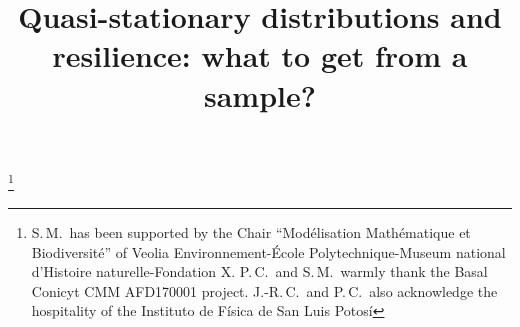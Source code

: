 \documentclass[JEP,XML,SOM,Unicode]{cedram}
\numberwithin{equation}{section}
\theoremstyle{plain}
\theoremstyle{definition}
\begin{document}
\frontmatter
\title{Quasi-stationary distributions and resilience: what to get from a sample?}

\author[\initial{J.-R.} \lastname{Chazottes}]{ }
\address{CPHT, CNRS, École polytechnique, Institut polytechnique de Paris\\
F-91128 Palaiseau, France}

\author[\initial{P.} \lastname{Collet}]{ }
\address{CPHT, CNRS, École polytechnique, Institut polytechnique de Paris\\
F-91128 Palaiseau, France}

\author[\initial{S.} \lastname{Martínez}]{ }
\address{DIM-CMM, Universidad de Chile, UMI 2807 UChile-CNRS\\
Beauchef 851, Santiago, Chile}

\author[\initial{S.} \lastname{Méléard}]{ }
\address{CMAP, CNRS, École polytechnique, Institut polytechnique de Paris\\
F-91128 Palaiseau, France}

\thanks{S.\,M.\ has been supported by the Chair ``Modélisation Mathématique et Biodiversité'' of Veolia Environnement-École Polytechnique-Museum national d'Histoire naturelle-Fondation X. P.\,C.\ and S.\,M.\ warmly thank the Basal Conicyt CMM AFD170001 project. J.-R.\,C.\ and P.\,C.\ also acknowledge the hospitality of the Instituto de Física de San Luis Potosí}
\end{document}

